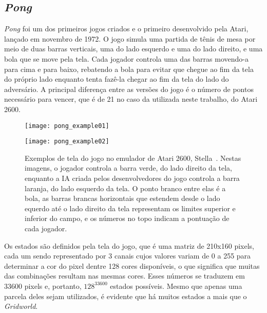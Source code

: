 \subsection{\textit{Pong}}
\label{sec:pong}

\textit{Pong} foi um dos primeiros jogos criados e o primeiro desenvolvido pela Atari, lançado em novembro de 1972.
O jogo simula uma partida de tênis de mesa por meio de duas barras verticais, uma do lado esquerdo e uma do lado direito, e uma bola que se move pela tela.
Cada jogador controla uma das barras movendo-a para cima e para baixo, rebatendo a bola para evitar que chegue ao fim da tela do próprio lado enquanto tenta fazê-la chegar ao fim da tela do lado do adversário.
A principal diferença entre as versões do jogo é o número de pontos necessário para vencer, que é de 21 no caso da utilizada neste trabalho, do Atari 2600.

\begin{figure}[h!]
  \begin{minipage}[b]{.5\textwidth}
  \centering
  \texttt{[image: pong\_example01]}
  \end{minipage}
  \hfill
  \begin{minipage}[b]{.5\textwidth}
  \texttt{[image: pong\_example02]}
  \end{minipage}
  \caption{Exemplos de tela do jogo no emulador de Atari 2600, Stella~\cite{stella}. Nestas imagens, o jogador controla a barra verde, do lado direito da tela, enquanto a IA criada pelos desenvolvedores do jogo controla a barra laranja, do lado esquerdo da tela. O ponto branco entre elas é a bola, as barras brancas horizontais que estendem desde o lado equerdo até o lado direito da tela representam os limites superior e inferior do campo, e os números no topo indicam a pontuação de cada jogador.}
\end{figure}

Os estados são definidos pela tela do jogo, que é uma matriz de 210x160 pixels, cada um sendo representado por 3 canais cujos valores variam de 0 a 255 para determinar a cor do pixel dentre 128 cores disponíveis, o que significa que muitas das combinações resultam nas mesmas cores.
Esses números se traduzem em 33600 pixels e, portanto, $128^{33600}$ estados possíveis.
Mesmo que apenas uma parcela deles sejam utilizados, é evidente que há muitos estados a mais que o \textit{Gridworld}.

